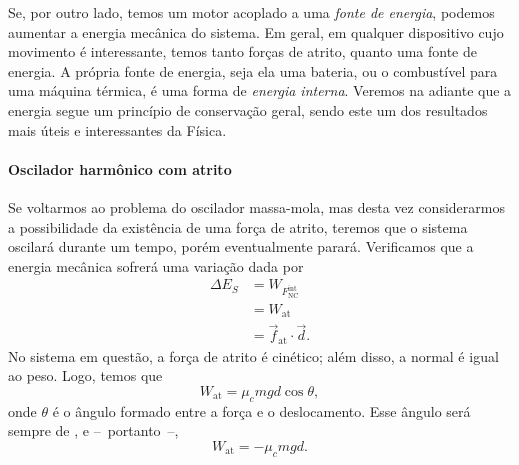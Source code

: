Se, por outro lado, temos um motor acoplado a uma \emph{fonte de energia}, podemos aumentar a energia mecânica do sistema. Em geral, em qualquer dispositivo cujo movimento é interessante, temos tanto forças de atrito, quanto uma fonte de energia. A própria fonte de energia, seja ela uma bateria, ou o combustível para uma máquina térmica, é uma forma de \emph{energia interna}. Veremos na adiante que a energia segue um princípio de conservação geral, sendo este um dos resultados mais úteis e interessantes da Física.

\paragraph{Oscilador harmônico com atrito}

Se voltarmos ao problema do oscilador massa-mola, mas desta vez considerarmos a possibilidade da existência de uma força de atrito, teremos que o sistema oscilará durante um tempo, porém eventualmente parará. Verificamos que a energia mecânica sofrerá uma variação dada por
\begin{align}
    \Delta E_S &= W_{F_{\textrm{NC}}^{\textrm{int}}} \\
    &= W_{\textrm{at}} \\
    &= \vec{f}_{\textrm{at}} \cdot \vec{d}.
\end{align}
%
No sistema em questão, a força de atrito é cinético; além disso, a normal é igual ao peso. Logo, temos que
\begin{equation}
    W_{\textrm{at}} = \mu_c m g d \cos \theta,
\end{equation}
%
onde $\theta$ é o ângulo formado entre a força e o deslocamento. Esse ângulo será sempre de , e --~portanto~--,
\begin{equation}
    W_{\textrm{at}} = - \mu_c m g d.
\end{equation}

